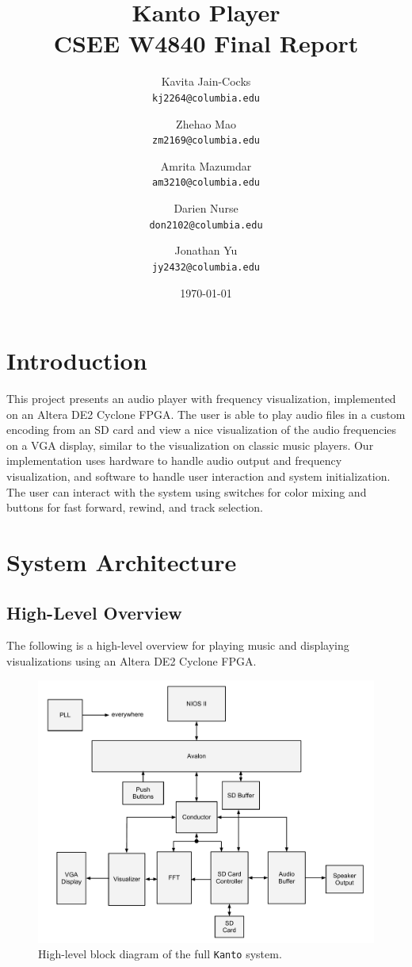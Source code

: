 \documentclass{article}
\title{Kanto Player \\
CSEE W4840 Final Report}
\author{
  Kavita Jain-Cocks\\
  \texttt{kj2264@columbia.edu}
  \and
  Zhehao Mao\\
  \texttt{zm2169@columbia.edu}
  \and
  Amrita Mazumdar\\
  \texttt{am3210@columbia.edu}
  \and
  Darien Nurse\\
  \texttt{don2102@columbia.edu}
  \and
  Jonathan Yu\\
  \texttt{jy2432@columbia.edu}
   \\}
\date{\today}
\begin{document}
\maketitle
\newpage

\section{Introduction}
This project presents an audio player with frequency visualization, implemented
on an Altera DE2 Cyclone FPGA. The user is able to play audio files in a custom
encoding from an SD card and view a nice visualization of the audio frequencies
on a VGA display, similar to the visualization on classic music players. Our
implementation uses hardware to handle audio output and frequency
visualization, and software to handle user interaction and system
initialization. The user can interact with the system using switches for color
mixing and buttons for fast forward, rewind, and track selection.

\section{System Architecture}

\subsection{High-Level Overview}

The following is a high-level overview for playing music and displaying 
visualizations using an Altera DE2 Cyclone FPGA.

\begin{figure}[H]
	\centering
	\includegraphics[scale=0.45]{top_level}
	\caption{High-level block diagram of the full \texttt{Kanto} system.}
\end{figure}
\end{document}
